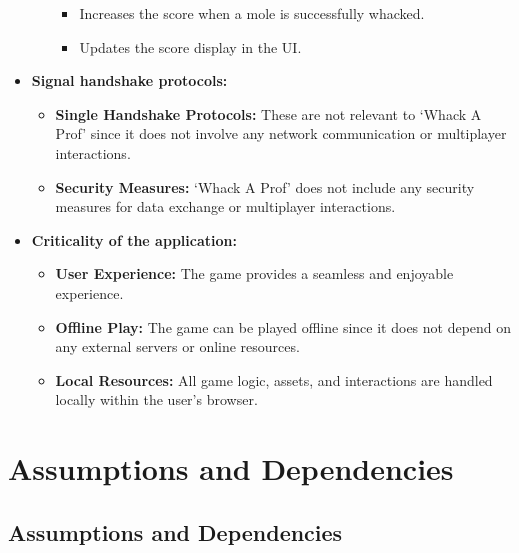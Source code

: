 \documentclass{article}
\begin{document}
\begin{itemize}
\begin{itemize}
        \begin{itemize}
            \item Increases the score when a mole is successfully whacked.
            \item Updates the score display in the UI.
        \end{itemize}
    \end{itemize}
    \item \textbf{Signal handshake protocols:}
    \begin{itemize}
        \item \textbf{Single Handshake Protocols:} These are not relevant to ‘Whack A Prof’ since it does not involve any network communication or multiplayer interactions.
        \item \textbf{Security Measures:} ‘Whack A Prof’ does not include any security measures for data exchange or multiplayer interactions.
    \end{itemize}    
    \item \textbf{Criticality of the application:}
    \begin{itemize}
        \item \textbf{User Experience:} The game provides a seamless and enjoyable experience.
        \item \textbf{Offline Play:} The game can be played offline since it does not depend on any external servers or online resources.
        \item \textbf{Local Resources:} All game logic, assets, and interactions are handled locally within the user's browser.
    \end{itemize}
\end{itemize}
\section{Assumptions and Dependencies}
\subsection{Assumptions and Dependencies}
\end{document}

